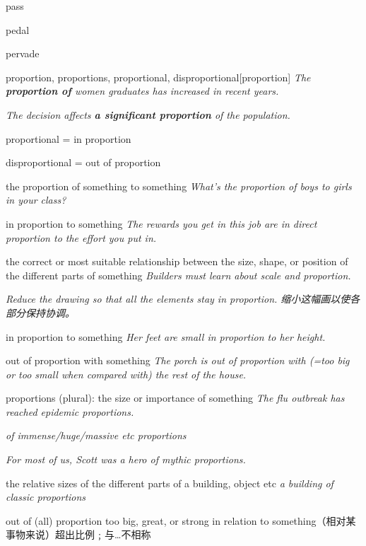 \begin{DefWord}{pass}
\end{DefWord}

\begin{DefWord}{pedal}
\end{DefWord}

\begin{DefWord}{pervade}
\end{DefWord}

\begin{DefWord}{proportion, proportions, proportional, disproportional}[proportion]
    \textit{The \textbf{proportion of} women graduates has increased in recent years.}

    \textit{The decision affects \textbf{a significant proportion} of the population.}

    proportional = in proportion

    disproportional = out of proportion


the proportion of something to something
\textit{What’s the proportion of boys to girls in your class?}

in proportion to something
\textit{The rewards you get in this job are in direct proportion to the effort you put in.}

the correct or most suitable relationship between the size, shape, or position of the different parts of something
\textit{Builders must learn about scale and proportion.}

\textit{Reduce the drawing so that all the elements stay in proportion. 缩小这幅画以使各部分保持协调。}

in proportion to something
\textit{Her feet are small in proportion to her height.}

out of proportion with something
\textit{The porch is out of proportion with (=too big or too small when compared with) the rest of the house.}

proportions (plural):
the size or importance of something
\textit{The flu outbreak has reached epidemic proportions.}

\textit{of immense/huge/massive etc proportions}

\textit{For most of us, Scott was a hero of mythic proportions.}

the relative sizes of the different parts of a building, object etc
\textit{a building of classic proportions}

out of (all) proportion too big, great, or strong in relation to something（相对某事物来说）超出比例﹔与…不相称


\end{DefWord}
